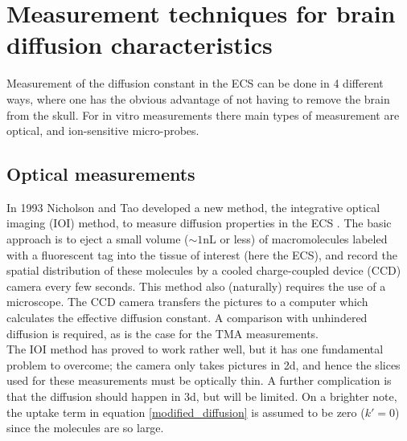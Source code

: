 \documentclass[a4paper,english, 12pt, twoside]{article}
\begin{document}
\section{Measurement techniques for brain diffusion characteristics}
Measurement of the diffusion constant in the ECS can be done in 4 different ways, where one has the obvious advantage of not having to remove the brain from the skull. 
For in vitro measurements there main types of measurement are optical, and ion-sensitive micro-probes. 

\subsection{Optical measurements}
In 1993 Nicholson and Tao developed a new method, the integrative optical imaging (IOI) method, to measure diffusion properties in the ECS \cite{nicholson2001diffusion,nicholson1993hindered}.
The basic approach is to eject a small volume ($\sim 1$nL or less) of macromolecules labeled with a fluorescent tag into the tissue of interest (here the ECS), and record the spatial distribution of these molecules by a cooled charge-coupled device (CCD) camera every few seconds. 
This method also (naturally) requires the use of a microscope. 
The CCD camera transfers the pictures to a computer which calculates the effective diffusion constant. 
A comparison with unhindered diffusion is required, as is the case for the TMA measurements. \\
The IOI method has proved to work rather well, but it has one fundamental problem to overcome; the camera only takes pictures in 2d, and hence the slices used for these measurements must be optically thin. 
A further complication is that the diffusion should happen in 3d, but will be limited. 
On a brighter note, the uptake term in equation \ref{modified_diffusion} is assumed to be zero ($k' = 0$) since the molecules are so large.
\end{document}
